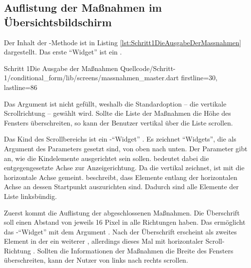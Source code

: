\subsection{Auflistung der Maßnahmen im Übersichtsbildschirm}

Der Inhalt der -Methode ist in Listing \ref{lst:Schritt1DieAusgabeDerMassnahmen} dargestellt.
Das erste \enquote{Widget} ist ein  .
\begin{alexlisting}{Schritt 1}{Die Ausgabe der Maßnahmen}
  {Quellcode/Schritt-1/conditional_form/lib/screens/massnahmen_master.dart}
  {firstline=30, lastline=86}
  \label{lst:Schritt1DieAusgabeDerMassnahmen}
\end{alexlisting}

Das Argument  ist nicht gefüllt, weshalb die Standardoption -- die vertikale Scrollrichtung -- gewählt wird.
Sollte die Liste der Maßnahmen die Höhe des Fensters überschreiten, so kann der Benutzer vertikal über die Liste scrollen.



Das Kind des Scrollbereichs ist ein -\enquote{Widget} .
Es zeichnet \enquote{Widgets}, die als Argument des Parameters  gesetzt sind, von oben nach unten.
Der Parameter  gibt an, wie die Kindelemente ausgerichtet sein sollen.  bedeutet dabei die entgegengesetzte Achse zur Anzeigerichtung.
Da die  vertikal zeichnet, ist mit  die horizontale Achse gemeint.
 beschreibt, dass Elemente entlang der horizontalen Achse an dessen Startpunkt auszurichten sind. Dadurch sind alle Elemente der Liste linksbündig.

Zuerst kommt die Auflistung der abgeschlossenen Maßnahmen.
Die Überschrift   soll einen Abstand von jeweils 16 Pixel in alle Richtungen haben.
Das ermöglicht das -\enquote{Widget}   mit dem Argument .
Nach der Überschrift erscheint als zweites Element in der  ein weiterer  ,
allerdings dieses Mal mit horizontaler Scroll-Richtung .
Sollten die Informationen der Maßnahmen die Breite des Fensters überschreiten, kann der Nutzer von links nach rechts scrollen.

